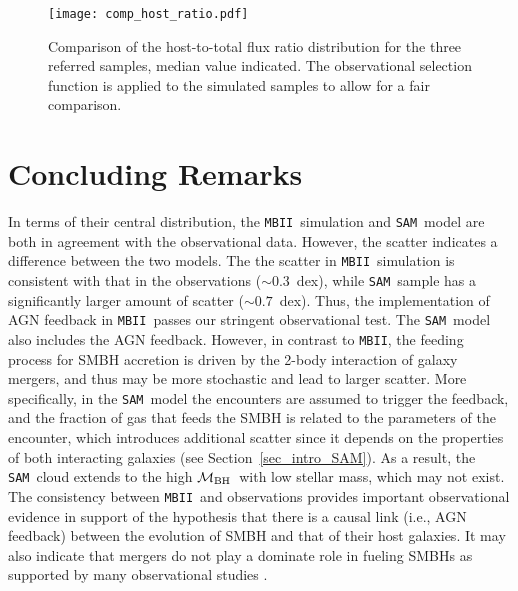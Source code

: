 \documentclass[twocolumn,trackchanges]{aastex63}
\newcommand{\mbh}{$\mathcal M_{\rm BH}$}
\newcommand{\sam}{\texttt{SAM}}
\newcommand{\mbii}{\texttt{MBII}}
\begin{document}
\begin{figure}[t]
\texttt{[image: comp\_host\_ratio.pdf]}
\caption{Comparison of the host-to-total flux ratio distribution for the three referred samples, median value indicated. The observational selection function is applied to the simulated samples to allow for a fair comparison.
}
\label{fig:comp_hist}
\end{figure}

\section{Concluding Remarks}
\label{sec:conclusion}
In terms of their central distribution, the \mbii\ simulation and \sam\ model are both in agreement with the observational data. However, the scatter indicates a difference between the two models. The  the scatter in \mbii\ simulation is consistent with that in the observations ($\sim0.3$~dex), while \sam\ sample has a significantly larger amount of scatter ($\sim0.7$~dex). Thus, the implementation of AGN feedback in \mbii\ passes our stringent observational test. The \sam\ model also includes the AGN feedback. However, in contrast to \mbii, the feeding process for SMBH accretion is driven by the 2-body interaction of galaxy mergers, and thus may be more stochastic and lead to larger scatter. More specifically, in the \sam\ model the encounters are assumed to trigger the feedback, and the fraction of gas that feeds the SMBH is related to the parameters of the encounter, which introduces additional scatter since it depends on the properties of both interacting galaxies (see Section~\ref{sec_intro_SAM}). As a result, the \sam\ cloud extends to the high \mbh\ with low stellar mass, which may not exist. The consistency between \mbii\ and observations provides important observational evidence in support of the hypothesis that there is a causal link (i.e., AGN feedback) between the evolution of SMBH and that of their host galaxies. It may also indicate that mergers do not play a dominate role in fueling SMBHs as supported by many observational studies \citep{Ellison2011, Silverman2011,Mechtley2016,Goulding2018}.
\end{document}
